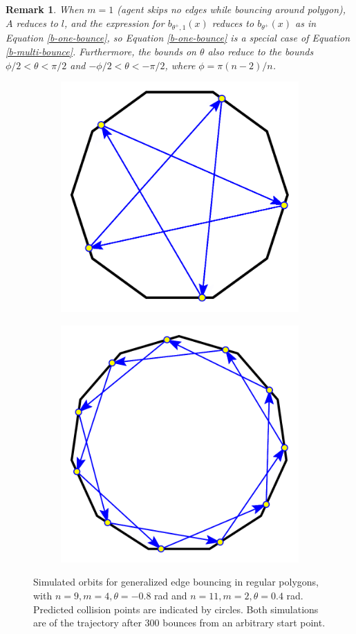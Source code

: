 \documentclass[letterpaper, 10 pt, conference]{ieeeconf}  %
\newtheorem{remark}{\bf Remark}
\begin{document}
\begin{remark} When $m=1$ (agent skips no edges while bouncing around polygon), $A$
reduces to $l$, and the expression for $b_{\theta^+, 1}(x)$ reduces to
$b_{\theta^+}(x)$ as in Equation \ref{b-one-bounce}, so Equation
\ref{b-one-bounce} is a special case of Equation \ref{b-multi-bounce}.
Furthermore, the bounds on $\theta$ also reduce to the bounds $\phi/2 < \theta < \pi/2$ and $-\phi/2 < \theta < -\pi/2$, where $\phi=\pi(n-2)/n$.
\end{remark}

\begin{figure}[th]
\begin{subfigure}{.25\textwidth}
\centering

\includegraphics[width=0.7\linewidth]{../figs/nonagon_neg0pt8rad_skip3.pdf}

\end{subfigure}%
\begin{subfigure}{0.25\textwidth}

\includegraphics[width=0.7\linewidth]{../figs/eleven_limit_m2.pdf}

\end{subfigure}

\caption{Simulated orbits for generalized edge bouncing in
regular polygons, with $n=9, m=4, \theta=-0.8$ rad and $n=11, m=2, \theta=0.4$
rad. Predicted collision points are indicated by circles. Both simulations are of the trajectory after 300 bounces
from an arbitrary start point. \label{ccw-m-bounce}}
\end{figure}
\end{document}

